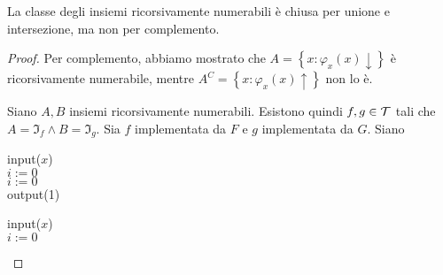\begin{theor}
	La classe degli insiemi ricorsivamente numerabili è chiusa per unione e intersezione, ma non per complemento.
\end{theor}
\begin{proof}
	Per complemento, abbiamo mostrato che $A= \left\{ x: \varphi_x (x) \downarrow \right\}$ è ricorsivamente numerabile, mentre $A^C = \left\{x: \varphi_x (x) \uparrow\right\}$ non lo è.

	Siano $A,B$ insiemi ricorsivamente numerabili. Esistono quindi $f,g \in \mathcal{T}$ tali che $A = \Im_f \wedge B = \Im_g$. Sia $f$ implementata da $F$ e $g$ implementata da $G$. Siano
	\begin{center}
		\begin{minipage}{.45\textwidth}
			\begin{tcolorbox}[
				colback=white,
				sharp corners,
				boxrule=.3mm,
				left=20pt,
				top=0pt,
				bottom=0pt,
				title=$P_i$,
				colbacktitle=white,
				coltitle=black
				]
				\begin{algorithm}[H]
					input($x$) \\
					$i := 0$ \\
					$i := 0$ \\
					output(1)
				\end{algorithm}
			\end{tcolorbox}
		\end{minipage}
		\begin{minipage}{.45\textwidth}
			\begin{tcolorbox}[
				colback=white,
				sharp corners,
				boxrule=.3mm,
				left=20pt,
				top=0pt,
				bottom=0pt,
				title=$P_u$,
				colbacktitle=white,
				coltitle=black
				]
				\begin{algorithm}[H]
					input($x$) \\
					$i := 0$ \\
				\end{algorithm}

\end{tcolorbox}
\end{minipage}
\end{center}
\end{proof}
